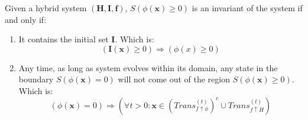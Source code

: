 \documentclass{article}
\begin{document}
\begin{Theorem}
\label{thm:trans}
Given a hybrid system $(\boldsymbol{H}, \boldsymbol{I}, \boldsymbol{f})$, $S(\phi(\boldsymbol{x}) \geq 0)$ is an invariant of the system if and only if:
	\begin{enumerate}
		\item It contains the initial set $\boldsymbol{I}$. Which is: 
			\begin{equation*}
				(\boldsymbol{I}(\boldsymbol{x}) \geq 0) \Rightarrow (\phi(x) \geq 0)
			\end{equation*}
		\item Any time, as long as system evolves within its domain, any state in the boundary $S(\phi(\boldsymbol{x}) = 0)$ will not come out of the region $S(\phi(\boldsymbol{x}) \geq 0)$. Which is:
			\begin{equation*}
				(\phi(\boldsymbol{x}) = 0) \Rightarrow (\forall t>0: \boldsymbol{x} \in (Trans_{f \uparrow \phi}^{(t)})^c \cup Trans_{f \uparrow H}^{(t)})
			\end{equation*}
	\end{enumerate}
\end{Theorem}
\end{document}
